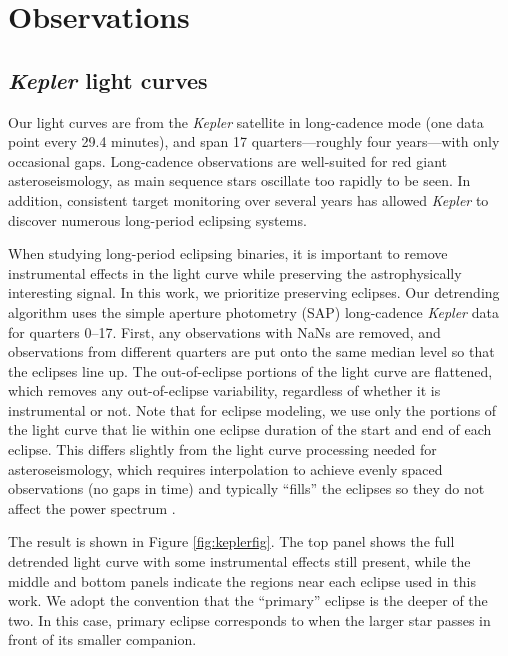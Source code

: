 \section{Observations}\label{data}

\subsection{\emph{Kepler} light curves}\label{kepler}
Our light curves are from the \emph{Kepler} satellite in long-cadence mode (one data point every 29.4 minutes), and span 17 quarters---roughly four years---with only occasional gaps. Long-cadence observations are well-suited for red giant asteroseismology, as main sequence stars oscillate too rapidly to be seen. In addition, consistent target monitoring over several years has allowed \emph{Kepler} to discover numerous long-period eclipsing systems.

When studying long-period eclipsing binaries, it is important to remove instrumental effects in the light curve while preserving the astrophysically interesting signal. In this work, we prioritize preserving eclipses. Our detrending algorithm uses the simple aperture photometry (SAP) long-cadence \emph{Kepler} data for quarters 0--17. First, any observations with NaNs are removed, and observations from different quarters are put onto the same median level so that the eclipses line up. The out-of-eclipse portions of the light curve are flattened, which removes any out-of-eclipse variability, regardless of whether it is instrumental or not. Note that for eclipse modeling, we use only the portions of the light curve that lie within one eclipse duration of the start and end of each eclipse. This differs slightly from the light curve processing needed for asteroseismology, which requires interpolation to achieve evenly spaced observations (no gaps in time) and typically ``fills'' the eclipses so they do not affect the power spectrum \citep{gau14}.

The result is shown in Figure \ref{fig:keplerfig}. The top panel shows the full detrended light curve with some instrumental effects still present, while the middle and bottom panels indicate the regions near each eclipse used in this work. We adopt the convention that the ``primary'' eclipse is the deeper of the two. In this case, primary eclipse corresponds to when the larger star passes in front of its smaller companion.
